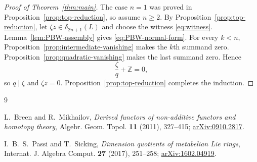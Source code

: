 \documentclass[11pt]{amsart}
\theoremstyle{remark}
\newcommand{\Z}{\mathbb Z}
\begin{document}
\begin{proof}[Proof of Theorem~\ref{thm:main}]
The case $n=1$ was proved in Proposition~\ref{prop:top-reduction}, so
assume $n\geq2$.
By Proposition~\ref{prop:top-reduction}, let
$\zeta z\in\delta_{2n+1}(L)$ and choose the witness
\eqref{eq:witness}.  Lemma~\ref{lem:PBW-assembly} gives
\eqref{eq:PBW-normal-form}.  For every $k<n$,
Proposition~\ref{prop:intermediate-vanishing} makes the $k$th summand zero.
Proposition~\ref{prop:quadratic-vanishing} makes the last summand zero.
Hence
\[
                         \frac\zeta q+\Z=0,
\]
so $q\mid\zeta$ and $\zeta z=0$.
Proposition~\ref{prop:top-reduction} completes the induction.
\end{proof}

\begin{thebibliography}{9}

L.~Breen and R.~Mikhailov,
\emph{Derived functors of non-additive functors and homotopy theory},
Algebr. Geom. Topol. \textbf{11} (2011), 327--415;
\href{https://arxiv.org/abs/0910.2817}{arXiv:0910.2817}.

I.~B.~S.~Passi and T.~Sicking,
\emph{Dimension quotients of metabelian Lie rings},
Internat. J. Algebra Comput. \textbf{27} (2017), 251--258;
\href{https://arxiv.org/abs/1602.04919}{arXiv:1602.04919}.

\end{thebibliography}
\end{document}
